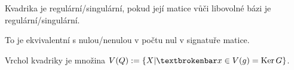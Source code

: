 \documentclass[12pt]{article}					%
\begin{document}
\begin{definice}
	Kvadrika je regulární/singulární, pokud její matice vůči libovolné bázi je regulární/singulární.

	\begin{poznamkain}
		To je ekvivalentní s nulou/nenulou v počtu nul v signatuře matice.
	\end{poznamkain}
\end{definice}

\begin{definice}
	Vrchol kvadriky je množina $V(Q) := \{X | ¦x \in V(g) = \Ker G\}$.
\end{definice}
\end{document}
